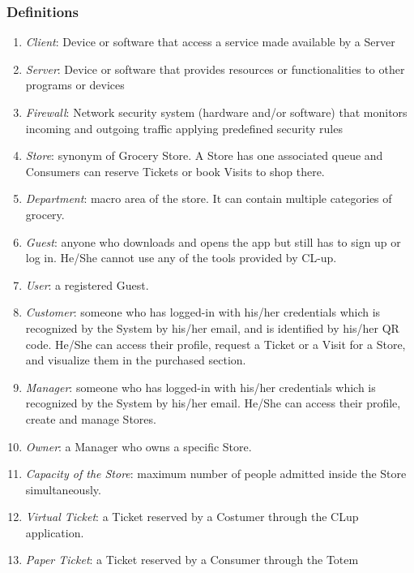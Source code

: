 \documentclass[a4paper, 12pt, oneside, table]{article}
\begin{document}
\subsubsection{Definitions}
\begin{enumerate}[label={D.\arabic{*}}]
\item \label{def:client}\textit{Client}: Device or software that access a service made available by a Server
\item \label{def:server}\textit{Server}: Device or software that provides resources or functionalities to other programs or devices
\item \label{def:firewall}\textit{Firewall}: Network security system (hardware and/or software) that monitors incoming and outgoing traffic applying predefined security rules
\item \label{def:store}\textit{Store}: synonym of Grocery Store. A Store has one associated queue and Consumers can reserve Tickets or book Visits to shop there.
\item \label{def:department}\textit{Department}: macro area of the store. It can contain multiple categories of grocery.
\item \label{def:Guest}\textit{Guest}: anyone who downloads and opens the app but still has to sign up or log in. He/She cannot use any of the tools provided by CL-up.
\item \label{def:user}\textit{User}: a registered Guest.
\item \label{def:customer}\textit{Customer}: someone who has logged-in with his/her credentials which is recognized by the System by his/her email, and is identified by his/her QR code. He/She can access their profile, request a Ticket or a Visit for a Store, and visualize them in the purchased section. 
\item \label{def:manager}\textit{Manager}: someone who has logged-in with his/her credentials  which is recognized by the System by his/her email. He/She can access their profile, create and manage Stores.
\item \label{def:owner}\textit{Owner}: a Manager who owns a specific Store.
\item \label{def:capacity}\textit{Capacity of the Store}: maximum number of people admitted inside the Store simultaneously.
\item \label{def:virtualTicket}\textit{Virtual Ticket}: a Ticket reserved by a Costumer through the CLup application.
\item \label{def:paperTicket}\textit{Paper Ticket}: a Ticket reserved by a Consumer through the Totem

\end{enumerate}
\end{document}
